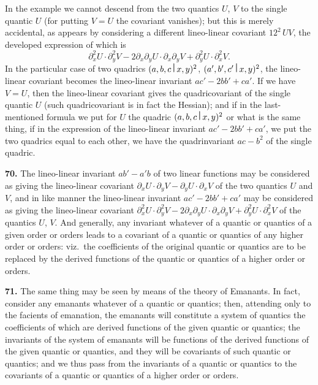 \documentclass[12pt,a4paper]{article}
\theoremstyle{definition}
\begin{document}
In the example we cannot descend from the two quantics $U$, $V$ to the single quantic $U$ (for putting $V=U$ the covariant vanishes); but this is merely accidental, as appears by considering a different lineo-linear covariant $12^2\,UV$, the developed expression of which is
\[\partial_x^2 U \cdot \partial_y^2 V - 2\partial_x\partial_y U \cdot \partial_x\partial_y V + \partial_y^2 U \cdot \partial_x^2 V.\]
In the particular case of two quadrics $(a,b,c\,\raisebox{0.5ex}{\textbf{\textbar}}\,x,y)^2$, $(a',b',c'\,\raisebox{0.5ex}{\textbf{\textbar}}\,x,y)^2$, the lineo-linear covariant becomes the lineo-linear invariant $ac'-2bb'+ca'$. If we have $V=U$, then the lineo-linear covariant gives the quadricovariant of the single quantic $U$ (such quadricovariant is in fact the Hessian); and if in the last-mentioned formula we put for $U$ the quadric $(a,b,c\,\raisebox{0.5ex}{\textbf{\textbar}}\,x,y)^2$ or what is the same thing, if in the expression of the lineo-linear invariant $ac'-2bb'+ca'$, we put the two quadrics equal to each other, we have the quadrinvariant $ac-b^2$ of the single quadric.

\medskip
\noindent\textbf{70.} The lineo-linear invariant $ab'-a'b$ of two linear functions may be considered as giving the lineo-linear covariant $\partial_x U \cdot \partial_y V - \partial_y U \cdot \partial_x V$ of the two quantics $U$ and $V$, and in like manner the lineo-linear invariant $ac'-2bb'+ca'$ may be considered as giving the lineo-linear covariant $\partial_x^2 U \cdot \partial_y^2 V - 2\partial_x\partial_y U \cdot \partial_x\partial_y V + \partial_y^2 U \cdot \partial_x^2 V$ of the quantics $U$, $V$. And generally, any invariant whatever of a quantic or quantics of a given order or orders leads to a covariant of a quantic or quantics of any higher order or orders: viz.\ the coefficients of the original quantic or quantics are to be replaced by the derived functions of the quantic or quantics of a higher order or orders.

\medskip
\noindent\textbf{71.} The same thing may be seen by means of the theory of Emanants. In fact, consider any emanants whatever of a quantic or quantics; then, attending only to the facients of emanation, the emanants will constitute a system of quantics the coefficients of which are derived functions of the given quantic or quantics; the invariants of the system of emanants will be functions of the derived functions of the given quantic or quantics, and they will be covariants of such quantic or quantics; and we thus pass from the invariants of a quantic or quantics to the covariants of a quantic or quantics of a higher order or orders.
\end{document}
